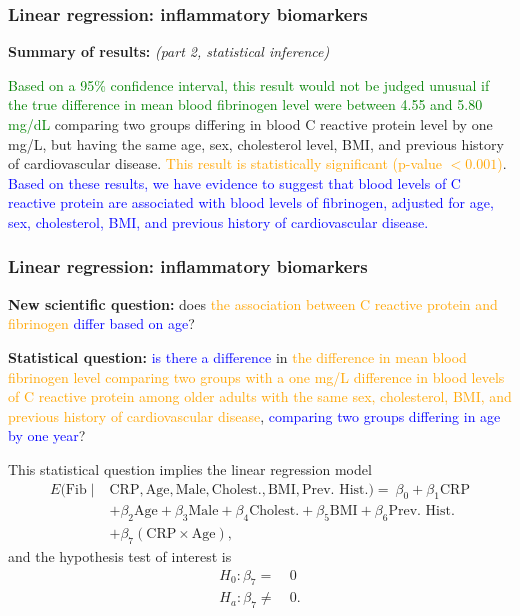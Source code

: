 \documentclass[12pt, 
hyperref={colorlinks=true, linkcolor=blue, urlcolor=cyan},dvipsnames]{beamer}
\begin{document}
\begin{frame}
\frametitle{Linear regression: inflammatory biomarkers}

\textbf{Summary of results:} \textit{(part 2, statistical inference)}

\textcolor{green}{Based on a 95\% confidence interval, this result would not be judged unusual if the true difference in mean blood fibrinogen level were between 4.55 and 5.80 mg/dL} comparing two groups differing in blood C reactive protein level by one mg/L, but having the same age, sex, cholesterol level, BMI, and previous history of cardiovascular disease. \textcolor{orange}{This result is statistically significant (p-value $< 0.001$)}. \textcolor{blue}{Based on these results, we have evidence to suggest that blood levels of C reactive protein are associated with blood levels of fibrinogen, adjusted for age, sex, cholesterol, BMI, and previous history of cardiovascular disease.}
\end{frame}

\begin{frame}
\frametitle{Linear regression: inflammatory biomarkers}
\textbf{New scientific question:} does \textcolor{orange}{the association between C reactive protein and fibrinogen} \textcolor{blue}{differ based on age}? 

\textbf{Statistical question:} \textcolor{blue}{is there a difference} in \textcolor{orange}{the difference in mean blood fibrinogen level comparing two groups with a one mg/L difference in blood levels of C reactive protein among older adults with the same sex, cholesterol, BMI, and previous history of cardiovascular disease}, \textcolor{blue}{comparing two groups differing in age by one year}?

This statistical question implies the linear regression model
{\small 
\begin{align*}
E(\text{Fib} \mid & \text{CRP}, \text{Age}, \text{Male}, \text{Cholest.}, \text{BMI}, \text{Prev. Hist.}) =  \ \beta_0 + \beta_1 \text{CRP} \\
&+ \beta_2 \text{Age}  + \beta_3 \text{Male} + \beta_4 \text{Cholest.} + \beta_5 \text{BMI} + \beta_6 \text{Prev. Hist.} \\
&+ \beta_7 (\text{CRP} \times \text{Age}),
\end{align*}
}
and the hypothesis test of interest is
\begin{align*}
H_0: \beta_7 = &\ 0 \\
H_a: \beta_7 \neq &\ 0.
\end{align*}
\end{frame}
\end{document}
